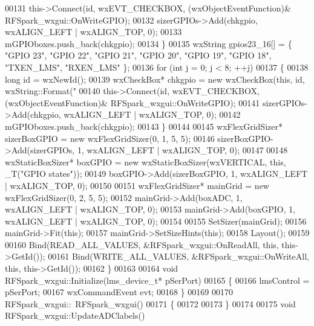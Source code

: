 \begin{DoxyCode}
{{{00131         this->Connect(\textcolor{keywordtype}{id}, wxEVT\_CHECKBOX, (wxObjectEventFunction)&
      RFSpark_wxgui::OnWriteGPIO);
00132         sizerGPIOs->Add(chkgpio, wxALIGN\_LEFT | wxALIGN\_TOP, 0);
00133         mGPIOboxes.push\_back(chkgpio);
00134     \}
00135     wxString gpios23\_16[] = \{ \textcolor{stringliteral}{"GPIO 23"}, \textcolor{stringliteral}{"GPIO 22"}, \textcolor{stringliteral}{"GPIO 21"}, \textcolor{stringliteral}{"GPIO 20"}, \textcolor{stringliteral}{"GPIO 19"}, \textcolor{stringliteral}{"GPIO 18"}, \textcolor{stringliteral}{"TXEN\_LMS"},
       \textcolor{stringliteral}{"RXEN\_LMS"} \};
00136     \textcolor{keywordflow}{for} (\textcolor{keywordtype}{int} j = 0; j < 8; ++j)
00137     \{
00138         \textcolor{keywordtype}{long} \textcolor{keywordtype}{id} = wxNewId();
00139         wxCheckBox* chkgpio = \textcolor{keyword}{new} wxCheckBox(\textcolor{keyword}{this}, \textcolor{keywordtype}{id}, wxString::Format(\textcolor{stringliteral}{"%
00140         this->Connect(\textcolor{keywordtype}{id}, wxEVT\_CHECKBOX, (wxObjectEventFunction)&
      RFSpark_wxgui::OnWriteGPIO);
00141         sizerGPIOs->Add(chkgpio, wxALIGN\_LEFT | wxALIGN\_TOP, 0);
00142         mGPIOboxes.push\_back(chkgpio);
00143     \}
00144 
00145     wxFlexGridSizer* sizerBoxGPIO = \textcolor{keyword}{new} wxFlexGridSizer(0, 1, 5, 5);
00146     sizerBoxGPIO->Add(sizerGPIOs, 1, wxALIGN\_LEFT | wxALIGN\_TOP, 0);
00147 
00148     wxStaticBoxSizer* boxGPIO = \textcolor{keyword}{new} wxStaticBoxSizer(wxVERTICAL, \textcolor{keyword}{this}, _T(\textcolor{stringliteral}{"GPIO states"}));
00149     boxGPIO->Add(sizerBoxGPIO, 1, wxALIGN\_LEFT | wxALIGN\_TOP, 0);
00150 
00151     wxFlexGridSizer* mainGrid = \textcolor{keyword}{new} wxFlexGridSizer(0, 2, 5, 5);
00152     mainGrid->Add(boxADC, 1, wxALIGN\_LEFT | wxALIGN\_TOP, 0);
00153     mainGrid->Add(boxGPIO, 1, wxALIGN\_LEFT | wxALIGN\_TOP, 0);
00154 
00155     SetSizer(mainGrid);
00156     mainGrid->Fit(\textcolor{keyword}{this});
00157     mainGrid->SetSizeHints(\textcolor{keyword}{this});
00158     Layout();
00159 
00160     Bind(READ\_ALL\_VALUES, &RFSpark_wxgui::OnReadAll, \textcolor{keyword}{this}, this->GetId());
00161     Bind(WRITE\_ALL\_VALUES, &RFSpark_wxgui::OnWriteAll, \textcolor{keyword}{this}, this->GetId());
00162 \}
00163 
00164 \textcolor{keywordtype}{void} RFSpark_wxgui::Initialize(lms_device_t* pSerPort)
00165 \{
00166     lmsControl = pSerPort;
00167     wxCommandEvent evt;
00168 \}
00169 
00170 RFSpark_wxgui::~RFSpark_wxgui()
00171 \{
00172 
00173 \}
00174 
00175 \textcolor{keywordtype}{void} RFSpark_wxgui::UpdateADClabels()
}}}}
\end{DoxyCode}
